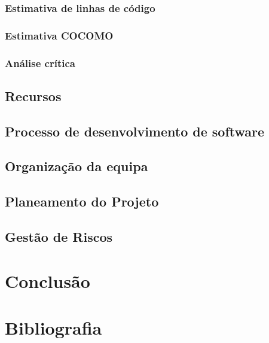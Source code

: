 \documentclass[a4paper]{report}
\begin{document}
\subsection{Estimativa de linhas de código}
\subsection{Estimativa COCOMO}
\subsection{Análise crítica}
\section{Recursos}
\section{Processo de desenvolvimento de software}
\section{Organização da equipa}
\section{Planeamento do Projeto}
\section{Gestão de Riscos}
\chapter{Conclusão}
\chapter{Bibliografia }
\end{document}
